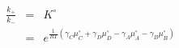 \begin{eqnarray}\label{eqn:equilibrium-constant}
\frac{k_+}{k_-} & = & K^\circ \\
 &  = & e^{\frac{1}{RT}\left(\gamma_C\mu_C^\circ+ \gamma_D\mu_D^\circ -\gamma_A\mu_A^\circ-\gamma_B\mu_B^\circ\right)} \\
\end{eqnarray}